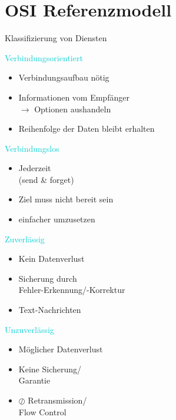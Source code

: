\section{OSI Referenzmodell}

\begin{concept}{Klassifizierung von Diensten}
    
    \begin{minipage}{0.6\linewidth}
        \textcolor{darkturquoise}{Verbindungsorientiert}
        \begin{itemize}
            \item Verbindungsaufbau nötig
            \item Informationen vom Empfänger\\ $\rightarrow$ Optionen aushandeln
            \item Reihenfolge der Daten bleibt erhalten
        \end{itemize}
    \end{minipage}
    \begin{minipage}{0.39\linewidth}
        \textcolor{darkturquoise}{Verbindungslos}
        \begin{itemize}
            \item Jederzeit\\ (send \& forget)
            \item Ziel muss nicht bereit sein
            \item einfacher umzusetzen
        \end{itemize}
    \end{minipage}

    \vspace{0.5mm}

    \begin{minipage}{0.6\linewidth}
        \textcolor{darkturquoise}{Zuverlässig}
        \begin{itemize}
            \item Kein Datenverlust
            \item Sicherung durch\\Fehler-Erkennung/-Korrektur
            \item Text-Nachrichten
        \end{itemize}
    \end{minipage}
    \begin{minipage}{0.39\linewidth}
        \textcolor{darkturquoise}{Unzuverlässig}
        \begin{itemize}
            \item Möglicher Datenverlust
            \item Keine Sicherung/ \\ Garantie
            \item $\oslash$ Retransmission/ \\Flow Control
        \end{itemize}
    \end{minipage}
\end{concept}

